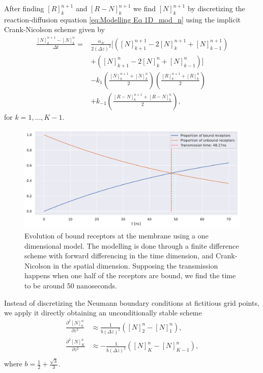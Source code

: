 \documentclass{article}
\begin{document}
After finding $[R]_k^{n+1}$ and $[R-N]_{k}^{n+1}$ we find $[N]_{k}^{n+1}$ by discretizing the reaction-diffusion equation \eqref{eq:Modelling Eq 1D_mod_n} using the implicit Crank-Nicolson scheme given by 
\begin{align}\label{eq:cn_1D}
        \frac{[N]_{k}^{n+1} - [N]_{k}^{n}}{\Delta t} =& \frac{\alpha_N}{2 (\Delta z)^2} [ \left( [N]_{k+1}^{n+1} - 2[N]_{k}^{n+1} + [N]_{k-1}^{n+1} \right) \\
                                                     & +\left( [N]_{k+1}^{n} - 2 [N]_{k}^{n}+ [N]_{k-1}^{n} \right) ] \\
                                                     &- k_1 \left( \frac{[N]_{k}^{n+1} + [N]_k^n}{2} \right) \left( \frac{[R]_{k}^{n+1} + [R]_k^n}{2} \right) \\
                                                     &+k_{-1}\left( \frac{[R-N]_{k}^{n+1} + [R-N]_k^n}{2} \right),
\end{align}
for $k = 1, \hdots, K - 1$.
\begin{figure}[b]
        \centering
        \includegraphics[width=0.5\linewidth]{./code/figures/receptors.pdf}
        \caption{Evolution of bound receptors at the membrane using a one dimensional model. 
                The modelling is done through a finite difference scheme with forward differencing in the time dimension, and Crank-Nicolson in the spatial dimension. 
                Supposing the transmission happens when one half of the receptors are bound, we find the time to be around 50 nanoseconds.
        }
        \label{fig:receptors}
\end{figure}
Instead of discretizing the Neumann boundary conditions at fictitious grid points, we apply it directly obtaining an unconditionally stable scheme \cite{khaliq}
\begin{align*}
        \frac{\partial^2 [N]_0^{n}}{\partial z^2} &\approx \frac{1}{b (\Delta z)^2}([N]_2^n - [N]_1^n), \\
        \frac{\partial^2 [N]_K^{n}}{\partial z^2} &\approx -\frac{1}{b (\Delta z)^2}([N]_K^n - [N]_{K-1}^n), \\
\end{align*}
where $b = \frac{1}{2} + \frac{\sqrt{3}}{3}$.
\end{document}
